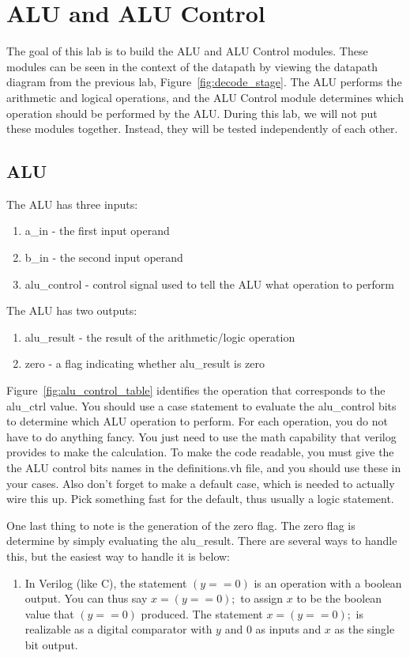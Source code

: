 \chapter{ALU and ALU Control}
The goal of this lab is to build the ALU and ALU Control modules. These modules can be seen in the context of the datapath by viewing the datapath diagram from the previous lab, Figure~\ref{fig:decode_stage}.  The ALU performs the arithmetic and logical operations, and the ALU Control module determines which operation should be performed by the ALU.  During this lab, we will not put these modules together.  Instead, they will be tested independently of each other.
\section{ALU}
The ALU has three inputs:
\begin{enumerate}
	\item a\_in - the first input operand
	\item b\_in - the second input operand
	\item alu\_control - control signal used to tell the ALU what operation to perform
\end{enumerate}
The ALU has two outputs:
\begin{enumerate}
	\item alu\_result - the result of the arithmetic/logic operation
	\item zero - a flag indicating whether alu\_result is zero
\end{enumerate}  
Figure~\ref{fig:alu_control_table} identifies the operation that corresponds to the alu\_ctrl value.  You should use a case statement to evaluate the alu\_control bits to determine which ALU operation to perform.  For each operation, you do not have to do anything fancy.  You just need to use the math capability that verilog provides to make the calculation.  To make the code readable, you must give the the ALU control bits names in the definitions.vh file, and you should use these in your cases.  Also don't forget to make a default case, which is needed to actually wire this up.  Pick something fast for the default, thus usually a logic statement.

One last thing to note is the generation of the zero flag.  The zero flag is determine by simply evaluating the alu\_result.  There are several ways to handle this, but the easiest way to handle it is below: 
\begin{enumerate}
\item In Verilog (like C), the statement $(y==0)$ is an operation with a boolean output.  You can thus say $x=(y==0);$ to assign $x$ to be the boolean value that $(y==0)$ produced.  The statement $x=(y==0);$ is realizable as a digital comparator with $y$ and $0$ as inputs and $x$ as the single bit output.
\end{enumerate}

